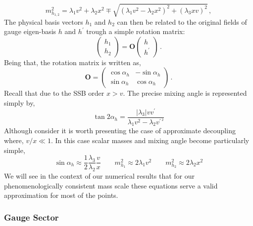 \begin{equation}
m_{h_{1,2}}^2 = \lambda_1 v^2 + \lambda_2 x^2 \mp \sqrt{(\lambda_1 v^2 - \lambda_2 x^2)^2 + (\lambda_3 x v)^2}\,,
\label{eq:eigvals}
\end{equation}
The physical basis vectors $h_1$ and $h_2$ can then be related to the original fields of gauge eigen-basis $h$ and $h^\prime$ trough a simple rotation matrix:
%
\begin{equation}
	\begin{pmatrix}
	h_1 \\
	h_2 
	\end{pmatrix}
	=
	\mathbf{O}
	\begin{pmatrix}
	h \\
	h^\prime 
	\end{pmatrix}\,.
	\label{eq:trans}
\end{equation}
%
Being that, the rotation matrix is written as, 
%
\begin{equation}
	\mathbf{O} = 
	\begin{pmatrix}
	\cos \alpha_h & -\sin \alpha_h \\
	\sin \alpha_h & \cos \alpha_h 
	\end{pmatrix}\,.
	\label{eq:rotmat}
\end{equation}
%
Recall that due to the SSB order $x > v$. The precise mixing angle is represented simply by, 
\begin{equation}
\tan 2 \alpha_h   = \frac{ \left| \lambda_3 \right|  v v^\prime }{\lambda_1 v^2 - \lambda_2 v^{\prime\,^2} } 
\end{equation} 
Although consider it is worth presenting the case of approximate decoupling where, $v/x\ll 1$. In this case scalar masses and mixing angle become particularly simple,
\begin{equation}
\sin \alpha_h \approx \dfrac{1}{2}\dfrac{\lambda_3}{\lambda_2} \dfrac{v}{x} \qquad
m_{h_1}^2 \approx 2 \lambda_1 v^2 \qquad m_{h_2}^2 \approx 2 \lambda_2 x^2
\label{eq:simplify}
\end{equation}
%
We will see in the context of our numerical results that for our phenomenologically consistent mass scale these equations serve a valid approximation for most of the  points.

\subsubsection{Gauge Sector}

